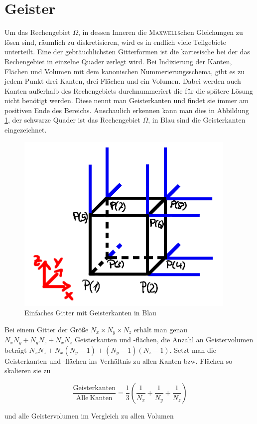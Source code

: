 
\section{Geister}

Um das Rechengebiet $\Omega$, in dessen Inneren die \textsc{Maxwells}chen Gleichungen zu lösen sind, räumlich zu diskretisieren, wird es in endlich viele Teilgebiete unterteilt. Eine der gebräuchlichsten Gitterformen ist die kartesische bei der das Rechengebiet in einzelne Quader zerlegt wird. Bei Indizierung der Kanten, Flächen und Volumen mit dem kanonischen Nummerierungsschema, gibt es zu jedem Punkt drei Kanten, drei Flächen und ein Volumen. Dabei werden auch Kanten außerhalb des Rechengebiets durchnummeriert die für die spätere Lösung nicht benötigt werden. Diese nennt man Geisterkanten und findet sie immer am positiven Ende des Bereichs. Anschaulich erkennen kann man dies in Abbildung \ref{fig:geister}, der schwarze Quader ist das Rechengebiet $\Omega$, in Blau sind die Geisterkanten eingezeichnet.

\begin{figure}[thbp]
	\centering
	\includegraphics[width=.5\textwidth]{data/Geister}
	\caption{Einfaches Gitter mit Geisterkanten in Blau}
	\label{fig:geister}
\end{figure}

Bei einem Gitter der Größe $ N_x \times N_y \times N_z$ erhält man genau $N_x N_y + N_y N_z + N_x N_z$ Geisterkanten und -flächen, die Anzahl an Geistervolumen beträgt $N_x N_z + N_x (N_y - 1) +(N_y - 1)(N_z - 1)$. Setzt man die Geisterkanten und -flächen ins Verhältnis zu allen Kanten bzw. Flächen so skalieren sie zu 

\begin{equation*}
	\frac{\mathrm{Geisterkanten}}{\mathrm{Alle \: Kanten}} = \frac{1}{3}(\frac{1}{N_x} + \frac{1}{N_y} + \frac{1}{N_z})
\end{equation*}

und alle Geistervolumen im Vergleich zu allen Volumen 

